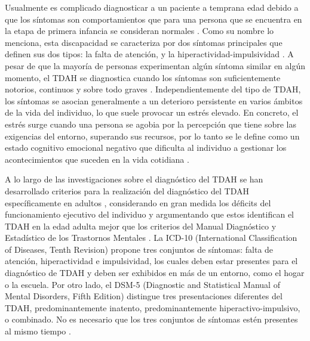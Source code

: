 \documentclass[10pt,journal,compsoc]{IEEEtran}
\begin{document}
Usualmente es complicado diagnosticar a un paciente a temprana edad debido a que los síntomas son comportamientos que para una persona que se encuentra en la etapa de primera infancia se consideran normales \cite{national-institute-of-mental-health-no-date}. Como su nombre lo menciona, esta discapacidad se caracteriza por dos síntomas principales que definen sus dos tipos: la falta de atención, y la hiperactividad-impulsividad \cite{combs2015perceived}. A pesar de que la mayoría de personas experimentan algún síntoma similar en algún momento, el TDAH se diagnostica cuando los síntomas son suficientemente notorios, continuos y sobre todo graves \cite{chen-2023}. Independientemente del tipo de TDAH, los síntomas se asocian generalmente a un deterioro persistente en varios ámbitos de la vida del individuo, lo que suele provocar un estrés elevado. En concreto, el estrés surge cuando una persona se agobia por la percepción que tiene sobre las exigencias del entorno, superando sus recursos, por lo tanto se le define como un estado cognitivo emocional negativo que dificulta al individuo a gestionar los acontecimientos que suceden en la vida cotidiana \cite{combs2015perceived}.

A lo largo de las investigaciones sobre el diagnóstico del TDAH se han desarrollado criterios para la realización del diagnóstico del TDAH específicamente en adultos \cite{combs2015perceived}, considerando en gran medida los déficits del funcionamiento ejecutivo del individuo y argumentando que estos identifican el TDAH en la edad adulta mejor que los criterios del Manual Diagnóstico y Estadístico de los Trastornos Mentales \cite{american2000diagnostic}. La ICD-10 (International Classification of Diseases, Tenth Revision) propone tres conjuntos de síntomas: falta de atención, hiperactividad e impulsividad, los cuales deben estar presentes para el diagnóstico de TDAH y deben ser exhibidos en más de un entorno, como el hogar o la escuela. Por otro lado, el DSM-5 (Diagnostic and Statistical Manual of Mental Disorders, Fifth Edition) distingue tres presentaciones diferentes del TDAH, predominantemente inatento, predominantemente hiperactivo-impulsivo, o combinado. No es necesario que los tres conjuntos de síntomas estén presentes al mismo tiempo \cite{doernberg2016neurodevelopmental}.
\end{document}
